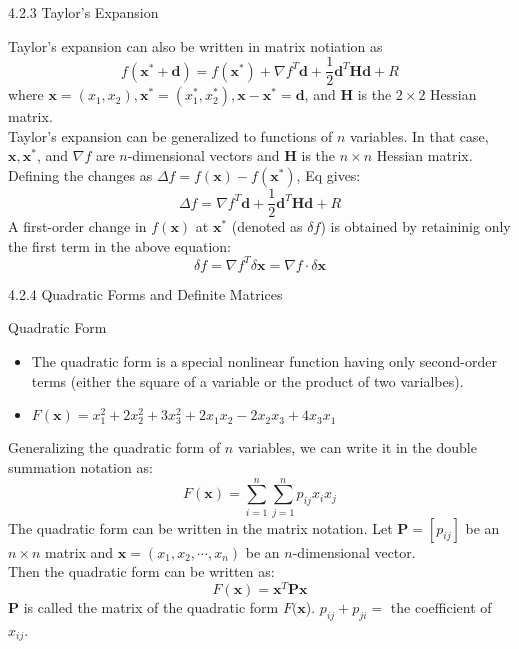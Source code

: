 \documentclass[aspectratio=169,xcolor=dvipsnames]{beamer}
\begin{document}
\begin{frame}{4.2.3 Taylor's Expansion}

Taylor's expansion can also be written in matrix notiation as
\begin{equation*}
    f(\mathbf{x}^* + \mathbf{d})  = f(\mathbf{x}^*) + \nabla f^T \mathbf{d} + \frac{1}{2} \mathbf{d}^T \mathbf{H} \mathbf{d} + R
\end{equation*}
where $\mathbf{x} = (x_1, x_2), \mathbf{x}^* = (x^*_1, x^*_2), \mathbf{x} - \mathbf{x}^* = \mathbf{d}$, and $\mathbf{H}$ is the $2 \times 2$ Hessian matrix. \\
\vspace{1em}
Taylor's expansion can be generalized to functions of $n$ variables.
In that case, $\mathbf{x}, \mathbf{x}^*$, and $\nabla f$ are $n$-dimensional vectors and $\mathbf{H}$ is the $n \times n$ Hessian matrix. \\
Defining the changes as $\Delta f = f(\mathbf{x}) - f(\mathbf{x}^*)$, Eq gives:
\begin{equation*}
    \Delta f = \nabla f^T \mathbf{d} + \frac{1}{2} \mathbf{d}^T \mathbf{H} \mathbf{d} + R
\end{equation*}
A first-order change in $f(\mathbf{x})$ at $\mathbf{x}^*$ (denoted as $\delta f$) is obtained by retaininig only the first term in the above equation:
\begin{equation}
    \delta f = \nabla f^T \delta \mathbf{x} = \nabla f \cdot \delta \mathbf{x}
\end{equation}

\end{frame}

\begin{frame}{4.2.4 Quadratic Forms and Definite Matrices}

Quadratic Form
\begin{itemize}
    \item The quadratic form is a special nonlinear function having only second-order terms (either the square of a variable or the product of two varialbes).
    \item $F(\mathbf{x}) = x^2_1 +2 x^2_2 + 3 x^2_3 + 2x_1 x_2 - 2 x_2 x_3 + 4 x_3 x_1$
\end{itemize}
Generalizing the quadratic form of $n$ variables, we can write it in the double summation notation as:
\begin{equation*}
    F(\mathbf{x}) = \sum^n_{i = 1} \sum^n_{j = 1} p_{ij} x_i x_j
\end{equation*}
The quadratic form can be written in the matrix notation.
Let $\mathbf{P} = [p_{ij}]$ be an $n \times n$ matrix and $\mathbf{x} = (x_1, x_2, \cdots, x_n)$ be an $n$-dimensional vector. \\
Then the quadratic form can be written as:
\begin{equation*}
    F(\mathbf{x}) = \mathbf{x}^T \mathbf{P} \mathbf{x}
\end{equation*}
$\mathbf{P}$ is called the matrix of the quadratic form $F(\mathbf{x}$). $ p_{ij} + p_{ji} = $ the coefficient of $x_{ij}$.
\end{frame}
\end{document}
